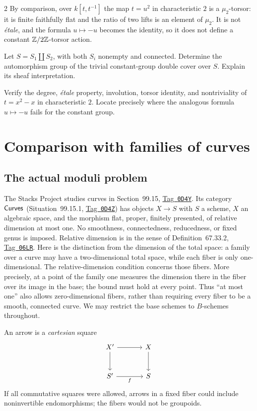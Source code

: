 \documentclass[12pt]{memoir}
\newcommand{\BGtag}[1]{\href{https://stacks.math.columbia.edu/tag/#1}{Tag~\texttt{#1}}}
\begin{document}
\begin{multicols}{2}
By comparison, over $k[t,t^{-1}]$ the map $t=u^2$ in characteristic $2$
is a $\mu_2$-torsor: it is finite faithfully flat and the ratio of two
lifts is an element of $\mu_2$. It is not \emph{\'etale}, and the
formula $u\mapsto-u$ becomes the identity, so it does not define a
constant $\mathbb{Z}/2\mathbb{Z}$-torsor action.

\begin{Ej}\label{ex:automorphisms}
Let $S=S_1\amalg S_2$, with both $S_i$ nonempty and connected. Determine
the automorphism group of the trivial constant-group double cover over
$S$. Explain its sheaf interpretation.
\end{Ej}
\begin{Ej}\label{ex:AS}
Verify the degree, \emph{\'etale} property, involution, torsor identity,
and nontriviality of $t=x^2-x$ in characteristic $2$. Locate precisely
where the analogous formula $u\mapsto-u$ fails for the constant group.
\end{Ej}

\section{Comparison with families of curves}\label{sec:curves}

\subsection{The actual moduli problem}
The Stacks Project studies curves in Section~99.15, \BGtag{0D4Y}.
Its category $\mathsf{Curves}$ (Situation~99.15.1, \BGtag{0D4Z}) has objects
$X\to S$ with $S$ a scheme, $X$ an algebraic space, and the morphism
flat, proper, finitely presented, of relative dimension at most one.
No smoothness, connectedness, reducedness, or fixed genus is imposed.
Relative dimension is in the sense of Definition~67.33.2,
\BGtag{06LR}. Here is the distinction from the dimension of the total
space: a family over a curve may have a two-dimensional total space,
while each fiber is only one-dimensional. The relative-dimension
condition concerns those fibers. More precisely, at a point of the
family one measures the dimension there in the fiber over its image
in the base; the bound must hold at every point. Thus ``at most one''
also allows zero-dimensional fibers, rather than requiring every fiber
to be a smooth, connected curve. We may restrict the base schemes to
$B$-schemes throughout.

An arrow is a \emph{cartesian} square
\[
\begin{tikzcd}[column sep=large,row sep=large]
 X' \arrow[r] \arrow[d] & X \arrow[d]\\
 S' \arrow[r,"f"'] & S
\end{tikzcd}
\]
If all commutative squares were allowed, arrows in a fixed fiber could
include noninvertible endomorphisms; the fibers would not be groupoids.


\end{multicols}
\end{document}
